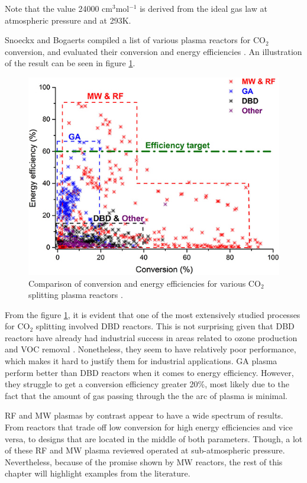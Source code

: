 Note that the value 24000 cm$^{3}$mol$^{-1}$ is derived from the ideal gas law at atmospheric pressure and at 293K. 

Snoeckx and Bogaerts compiled a list of various plasma reactors for CO$_2$ conversion, and evaluated their conversion and energy efficiencies \cite{Snoeckx2017}. An illustration of the result can be seen in figure \ref{fig:conversion_and_energy_efficiencies}. 

\begin{figure}[h!]
	\centering
	\includegraphics[width=0.6\linewidth]{chapter_3/figures/conversion_and_energy_efficiencies.jpg}
	\caption{Comparison of conversion and energy efficiencies for various CO$_2$ splitting plasma reactors \cite{Snoeckx2017}.}
	\label{fig:conversion_and_energy_efficiencies}
\end{figure}

From the figure \ref{fig:conversion_and_energy_efficiencies}, it is evident that one of the most extensively studied processes for CO$_2$ splitting involved DBD reactors. This is not surprising given that DBD reactors have already had industrial success in areas related to ozone production and VOC removal \cite{Kogelschatz2003}. Nonetheless, they seem to have relatively poor performance, which makes it hard to justify them for industrial applications. GA plasma perform better than DBD reactors when it comes to energy efficiency. However, they struggle to get a conversion efficiency greater 20\%, most likely due to the fact that the amount of gas passing through the the arc of plasma is minimal.

RF and MW plasmas by contrast appear to have a wide spectrum of results. From reactors that trade off low conversion for high energy efficiencies and vice versa, to designs that are located in the middle of both parameters. Though, a lot of these RF and MW plasma reviewed operated at sub-atmospheric pressure. Nevertheless, because of the promise shown by MW reactors, the rest of this chapter will highlight examples from the literature.

